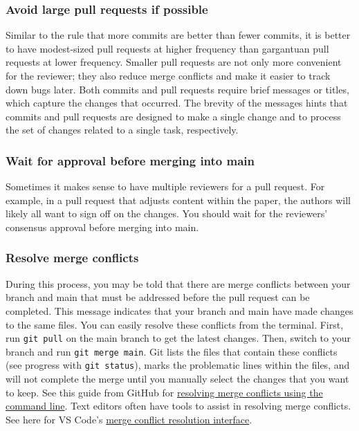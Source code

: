 \subsubsection{Avoid large pull requests if possible}
Similar to the rule that more commits are better than fewer commits,
it is better to have modest-sized pull requests at higher frequency
than gargantuan pull requests at lower frequency.
Smaller pull requests are not only more convenient for the reviewer;
they also reduce merge conflicts
and make it easier to track down bugs later.
Both commits and pull requests require brief messages or titles,
which capture the changes that occurred.
The brevity of the messages hints that commits and pull requests are designed
to make a single change and to process the set of changes related to a single task, respectively.

\subsubsection{Wait for approval before merging into main}
Sometimes it makes sense to have multiple reviewers for a pull request.
For example, in a pull request that adjusts content within the paper,
the authors will likely all want to sign off on the changes.
You should wait for the reviewers' consensus approval before merging into main.

\subsubsection{Resolve merge conflicts}
During this process, you may be told that there are merge conflicts between
your branch and main that must be addressed before the pull request can be completed.
This message indicates that your branch and main have made changes to the same files.
You can easily resolve these conflicts from the terminal.
First, run \texttt{git pull} on the main branch to get the latest changes.
Then, switch to your branch and run \texttt{git merge main}.
Git lists the files that contain these conflicts
(see progress with \texttt{git status}), marks the problematic lines within the files,
and will not complete the merge until you manually
select the changes that you want to keep.
See this guide from GitHub for
\href{https://help.github.com/articles/resolving-a-merge-conflict-using-the-command-line/}{resolving merge conflicts using the command line}.
Text editors often have tools to assist in resolving merge conflicts.
See here for VS Code's \href{https://code.visualstudio.com/docs/editor/versioncontrol#_merge-conflicts}{merge conflict resolution interface}.

